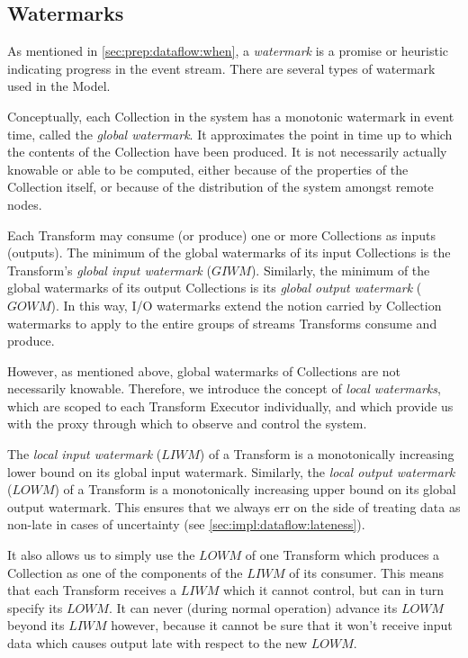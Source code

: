 \subsection{Watermarks}

As mentioned in \cref{sec:prep:dataflow:when}, a \emph{watermark} is a promise or heuristic indicating progress in the event stream.
There are several types of watermark used in the Model.

Conceptually, each Collection in the system has a monotonic watermark in event time, called the \emph{global watermark}.
It approximates the point in time up to which the contents of the Collection have been produced.
It is not necessarily actually knowable or able to be computed, either because of the properties of the Collection itself, or because of the distribution of the system amongst remote nodes.

Each Transform may consume (or produce) one or more Collections as inputs (outputs).
The minimum of the global watermarks of its input Collections is the Transform's \emph{global input watermark} ($\mathit{GIWM}$).
Similarly, the minimum of the global watermarks of its output Collections is its \emph{global output watermark} ($\mathit{GOWM}$).
In this way, I/O watermarks extend the notion carried by Collection watermarks to apply to the entire groups of streams Transforms consume and produce.

However, as mentioned above, global watermarks of Collections are not necessarily knowable.
Therefore, we introduce the concept of \emph{local watermarks}, which are scoped to each Transform Executor individually, and which provide us with the proxy through which to observe and control the system.

The \emph{local input watermark} ($\mathit{LIWM}$) of a Transform is a monotonically increasing lower bound on its global input watermark.
Similarly, the \emph{local output watermark} ($\mathit{LOWM}$) of a Transform is a monotonically increasing upper bound on its global output watermark.
This ensures that we always err on the side of treating data as non-late in cases of uncertainty (see \cref{sec:impl:dataflow:lateness}).

It also allows us to simply use the $\mathit{LOWM}$ of one Transform which produces a Collection as one of the components of the $\mathit{LIWM}$ of its consumer.
This means that each Transform receives a $\mathit{LIWM}$ which it cannot control, but can in turn specify its $\mathit{LOWM}$.
It can never (during normal operation\footnotemark) advance its $\mathit{LOWM}$ beyond its $\mathit{LIWM}$ however, because it cannot be sure that it won't receive input data which causes output late with respect to the new $\mathit{LOWM}$.

